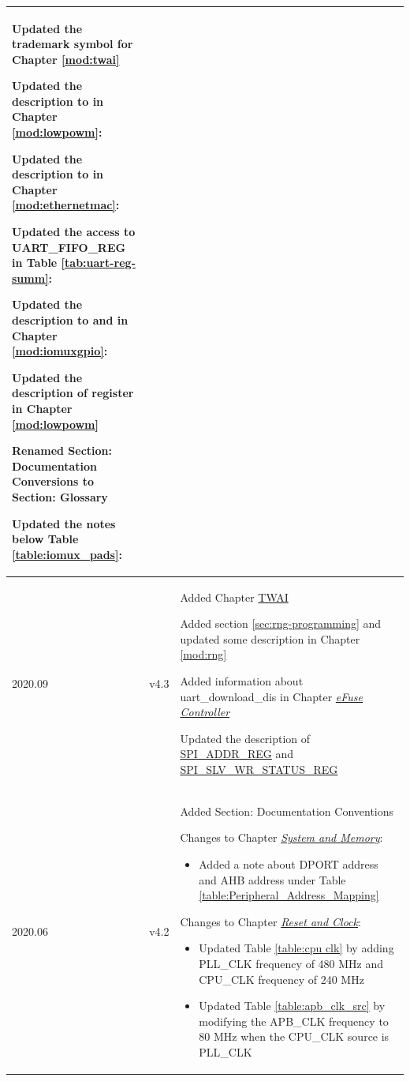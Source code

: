 \begin{longtable}[l]{ | m{2cm} | m{1.5cm} | m{12cm} | }
Updated the trademark symbol for Chapter \ref{mod:twai} \textit{\nameref{mod:twai}}

Updated the description to \nameref{regdesc:RTCCNTLWDTCONFIG0REG} in Chapter \ref{mod:lowpowm}: \textit{\nameref{mod:lowpowm}}

Updated the description to \nameref{fielddesc:MIICSRCLK} in Chapter \ref{mod:ethernetmac}: \textit{\nameref{mod:ethernetmac}}

Updated the access to UART\_FIFO\_REG in Table \ref{tab:uart-reg-summ}: \textit{\nameref{tab:uart-reg-summ}}

Updated the description to \nameref{regdesc:FUNWPU} and \nameref{regdesc:FUNWPD} in Chapter \ref{mod:iomuxgpio}: \textit{\nameref{mod:iomuxgpio}}

Updated the description of register \nameref{regdesc:RTCCNTLWDTCONFIG0REG} in Chapter \ref{mod:lowpowm} \textit{\nameref{mod:lowpowm}}

Renamed Section: Documentation Conversions to Section: Glossary

Updated the notes below Table \ref{table:iomux_pads}: \textit{\nameref{table:iomux_pads}}
\\\hline
2020.09 & v4.3 &
Added Chapter \hyperref[mod:twai]{TWAI}

Added section \ref{sec:rng-programming} \textit{\nameref{sec:rng-programming}} and updated some description in Chapter \ref{mod:rng} \textit{\nameref{mod:rng}}

Added information about uart\_download\_dis in Chapter \hyperref[mod:efuse]{\it{eFuse Controller}}

Updated the description of \hyperref[regdesc:SPIADDRREG]{SPI\_ADDR\_REG} and \hyperref[regdesc:SPISLVWRSTATUSREG]{SPI\_SLV\_WR\_STATUS\_REG}
\\\hline

2020.06 & v4.2 &
Added Section: Documentation Conventions

Changes to Chapter \hyperref[mod:sysmem]{\it{System and Memory}}:
\begin{itemize}
\item Added a note about DPORT address and AHB address under Table \ref{table:Peripheral_Address_Mapping}
\end{itemize}

Changes to Chapter \hyperref[mod:resclk]{\it{Reset and Clock}}:
\begin{itemize}
\item Updated Table \ref{table:cpu clk} by adding PLL\_CLK frequency of 480 MHz and CPU\_CLK frequency of 240 MHz
\item Updated Table \ref{table:apb_clk_src} by modifying the APB\_CLK frequency to 80 MHz when the CPU\_CLK source is PLL\_CLK
\end{itemize}


\end{longtable}
